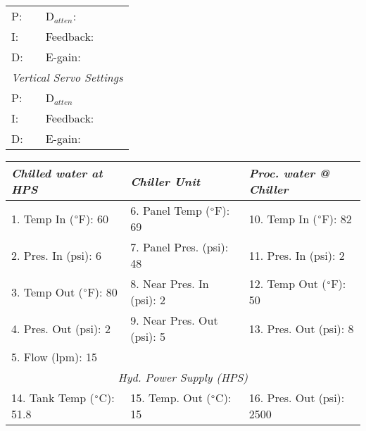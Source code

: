 \documentclass[letterpaper, 10pt]{article}
\begin{document}
\begin{table}[!ht]
        \footnotesize
        \renewcommand{\arraystretch}{1.1}
        \begin{tabular}{ p{1cm}|p{2cm} } \rowcolor[HTML]{EFEFEF}
            \multicolumn{2}{c}{\textit{Horizontal Servo Settings} \cellcolor[HTML]{EFEFEF}} \\ \hline P:  & D$_{atten}$:  \\ \hline
        I:  & Feedback:  \\ \hline 
        D:  & E-gain:  \\ \hline 
        \multicolumn{2}{c}{\textit{Vertical Servo Settings} \cellcolor[HTML]{EFEFEF}} \\ \hline 
        P:  & D$_{atten}$   \\ \hline 
        I:  & Feedback:  \\ \hline
        D:  & E-gain:  \\ \hline 
    \end{tabular} \hfill 
        \renewcommand{\arraystretch}{1.1}
        \begin{tabular}{ l|l|l } \rowcolor[HTML]{EFEFEF}
        \textit{Chilled water at HPS} & \textit{Chiller Unit} & \textit{Proc. water @ Chiller} \\ \hline 1. Temp In ($\degree$F): 60 & 6. Panel Temp ($\degree$F): 69 & 10. Temp In ($\degree$F): 82 \\ \hline 
    2. Pres. In (psi): 6 & 7. Panel Pres. (psi): 48 & 11. Pres. In (psi): 2 \\ \hline 
    3. Temp Out ($\degree$F): 80 & 8. Near Pres. In (psi): 2& 12. Temp Out ($\degree$F): 50 \\ \hline 
    4. Pres. Out (psi): 2& 9. Near Pres. Out (psi): 5& 13. Pres. Out (psi): 8 \\ \hline 
    5. Flow (lpm): 15 \\ \hline 
    \multicolumn{3}{c}{\textit{Hyd. Power Supply (HPS)} \cellcolor[HTML]{EFEFEF}} \\ \hline 
    14. Tank Temp ($\degree$C): 51.8 & 15. Temp. Out ($\degree$C): 15 & 16. Pres. Out (psi): 2500 \\ \hline 
    \end{tabular} 
    \end{table} \vspace{-0.5cm} 
\end{document}
